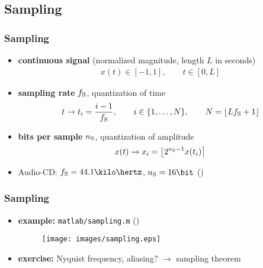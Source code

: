 
\subsection{Sampling}

\begin{frame}
	\frametitle{Sampling}
	\begin{itemize}
		\item \textbf{continuous signal} (normalized magnitude, length $L$ in seconds)
			\begin{align*}
				x(t)\in[-1,1],\qquad t\in[0,L]
			\end{align*}
		\item \textbf{sampling rate} $f_{\textrm S}$, quantization of time
			\begin{align*}
				t\rightarrow t_i=\frac{i-1}{f_{\textrm S}},\qquad i\in\{1,\ldots,N\},\qquad N=\lfloor Lf_{\textrm S}+1\rfloor
			\end{align*}
		\item \textbf{bits per sample} $n_{\textrm S}$, quantization of amplitude
			\begin{align*}
				x(t)\rightarrow x_i=\left\lfloor2^{n_{\textrm S}-1}x(t_i)\right\rceil
			\end{align*}
		\item Audio-CD: $f_{\textrm S}=44.1\kilo\hertz$, $n_{\textrm S}=16\bit$ ()
	\end{itemize}
\end{frame}

\begin{frame}
	\frametitle{Sampling}
	\begin{itemize}
		\item \textbf{example:} \texttt{matlab/sampling.m} ()
			\begin{figure}
				\texttt{[image: images/sampling.eps]}
			\end{figure}
		\item \textbf{exercise:} Nyquist frequency, aliasing? $\rightarrow$ sampling theorem
	\end{itemize}
\end{frame}

